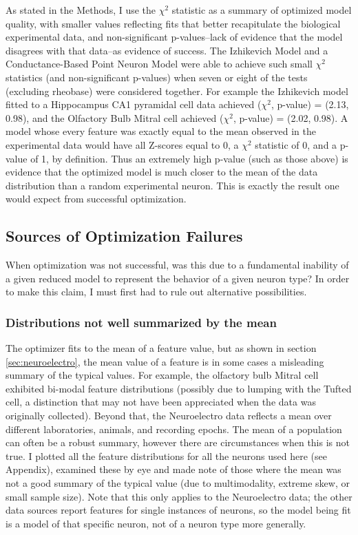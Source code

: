 As stated in the Methods, I use the $\chi^2$ statistic as a summary of optimized model quality, with smaller values reflecting fits that better recapitulate the biological experimental data, and non-significant p-values--lack of evidence that the model disagrees with that data--as evidence of success.
The Izhikevich Model and a Conductance-Based Point Neuron Model were able to achieve such small $\chi^2$ statistics (and non-significant p-values) when seven or eight of the tests (excluding rheobase) were considered together.
For example the Izhikevich model fitted to a Hippocampus CA1 pyramidal cell data achieved ($\chi^2$, p-value) = (2.13, 0.98), and the Olfactory Bulb Mitral cell achieved ($\chi^2$, p-value) = (2.02, 0.98).
A model whose every feature was exactly equal to the mean observed in the experimental data would have all Z-scores equal to 0, a $\chi^2$ statistic of 0, and a p-value of 1, by definition.
Thus an extremely high p-value (such as those above) is evidence that the optimized model is much closer to the mean of the data distribution than a random experimental neuron.
This is exactly the result one would expect from successful optimization.

\subsection{Sources of Optimization Failures}
When optimization was not successful, was this due to a fundamental inability of a given reduced model to represent the behavior of a given neuron type?
In order to make this claim, I must first had to rule out alternative possibilities.

\subsubsection{Distributions not well summarized by the mean}
The optimizer fits to the mean of a feature value, but as shown in section \ref{sec:neuroelectro}, the mean value of a feature is in some cases a misleading summary of the typical values.
For example, the olfactory bulb Mitral cell exhibited bi-modal feature distributions (possibly due to lumping with the Tufted cell, a distinction that may not have been appreciated when the data was originally collected).
Beyond that, the Neuroelectro data reflects a mean over different laboratories, animals, and recording epochs. The mean of a population can often be a robust summary, however there are circumstances when this is not true.
I plotted all the feature distributions for all the neurons used here (see Appendix), examined these by eye and made note of those where the mean was not a good summary of the typical value (due to multimodality, extreme skew, or small sample size).
Note that this only applies to the Neuroelectro data; the other data sources report features for single instances of neurons, so the model being fit is a model of that specific neuron, not of a neuron type more generally.

